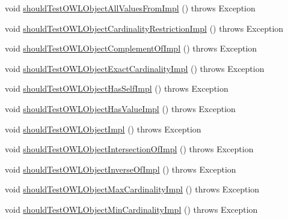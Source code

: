 \begin{DoxyCompactItemize}
\item 
void \hyperlink{classorg_1_1semanticweb_1_1owlapi_1_1contract_1_1_contract_owlapi__3_test_a4b0091d46d00e551a33c73070cbc717a}{should\-Test\-O\-W\-L\-Object\-All\-Values\-From\-Impl} ()  throws Exception 
\item 
void \hyperlink{classorg_1_1semanticweb_1_1owlapi_1_1contract_1_1_contract_owlapi__3_test_af14fcf9eba0b822a606a39bd6734cd7c}{should\-Test\-O\-W\-L\-Object\-Cardinality\-Restriction\-Impl} ()  throws Exception 
\item 
void \hyperlink{classorg_1_1semanticweb_1_1owlapi_1_1contract_1_1_contract_owlapi__3_test_a5ba9bd459c64e5c1b5d7c00959558128}{should\-Test\-O\-W\-L\-Object\-Complement\-Of\-Impl} ()  throws Exception 
\item 
void \hyperlink{classorg_1_1semanticweb_1_1owlapi_1_1contract_1_1_contract_owlapi__3_test_a7d24deddac97f446057eb5bc2b449325}{should\-Test\-O\-W\-L\-Object\-Exact\-Cardinality\-Impl} ()  throws Exception 
\item 
void \hyperlink{classorg_1_1semanticweb_1_1owlapi_1_1contract_1_1_contract_owlapi__3_test_a0ff30cbb9af42a798e7afaec4ca74288}{should\-Test\-O\-W\-L\-Object\-Has\-Self\-Impl} ()  throws Exception 
\item 
void \hyperlink{classorg_1_1semanticweb_1_1owlapi_1_1contract_1_1_contract_owlapi__3_test_a1900226ade42c37c65bb3a20b2cc38cb}{should\-Test\-O\-W\-L\-Object\-Has\-Value\-Impl} ()  throws Exception 
\item 
void \hyperlink{classorg_1_1semanticweb_1_1owlapi_1_1contract_1_1_contract_owlapi__3_test_aae3957d9f44fbce0fad641955496613f}{should\-Test\-O\-W\-L\-Object\-Impl} ()  throws Exception 
\item 
void \hyperlink{classorg_1_1semanticweb_1_1owlapi_1_1contract_1_1_contract_owlapi__3_test_a6a40130173b3ac13cb2db19065da0beb}{should\-Test\-O\-W\-L\-Object\-Intersection\-Of\-Impl} ()  throws Exception 
\item 
void \hyperlink{classorg_1_1semanticweb_1_1owlapi_1_1contract_1_1_contract_owlapi__3_test_aaa0dc944d574e1fa315e03b7af98a5ee}{should\-Test\-O\-W\-L\-Object\-Inverse\-Of\-Impl} ()  throws Exception 
\item 
void \hyperlink{classorg_1_1semanticweb_1_1owlapi_1_1contract_1_1_contract_owlapi__3_test_aeacc270ae0ad14fa9922f874562135da}{should\-Test\-O\-W\-L\-Object\-Max\-Cardinality\-Impl} ()  throws Exception 
\item 
void \hyperlink{classorg_1_1semanticweb_1_1owlapi_1_1contract_1_1_contract_owlapi__3_test_aefaaec8e38bfd36a5b92748044e25d25}{should\-Test\-O\-W\-L\-Object\-Min\-Cardinality\-Impl} ()  throws Exception 

\end{DoxyCompactItemize}
